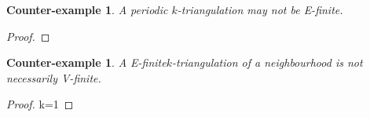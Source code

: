 \documentclass{amsart}
\newtheorem{ce}[theorem]{Counter-example}
\theoremstyle{remark}
\newcommand*{\nbd}[0]{neighbourhood\xspace}
\newcommand*{\ef}[0]{E-finite\xspace}
\newcommand*{\vf}[0]{V-finite\xspace}
\newcommand*{\ktg}[0]{$k$-triangulation\xspace}
\begin{document}
\begin{ce} 
A periodic \ktg may not be \ef.
\end{ce}
\begin{proof}

\end{proof}

\begin{ce}
A \ef \ktg of a \nbd is not necessarily \vf.
\end{ce}
\begin{proof}
k=1
\end{proof}





\end{document}

